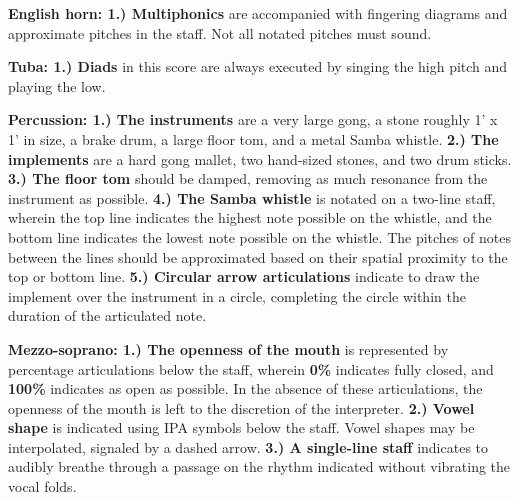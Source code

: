 \documentclass[11pt]{article}
\begin{document}
\begingroup
\textbf{English horn: 1.) Multiphonics} are accompanied with fingering diagrams and approximate pitches in the staff. Not all notated pitches must sound.
\endgroup

\begingroup
\textbf{Tuba: 1.) Diads} in this score are always executed by singing the high pitch and playing the low. 
\endgroup

\begingroup
\textbf{Percussion: 1.) The instruments} are a very large gong, a stone roughly 1' x 1' in size, a brake drum, a large floor tom, and a metal Samba whistle. \textbf{2.) The implements} are a hard gong mallet, two hand-sized stones, and two drum sticks. \textbf{3.) The floor tom} should be damped, removing as much resonance from the instrument as possible. \textbf{4.) The Samba whistle} is notated on a two-line staff, wherein the top line indicates the highest note possible on the whistle, and the bottom line indicates the lowest note possible on the whistle. The pitches of notes between the lines should be approximated based on their spatial proximity to the top or bottom line. \textbf{5.) Circular arrow articulations} indicate to draw the implement over the instrument in a circle, completing the circle within the duration of the articulated note.
\endgroup

\begingroup
\textbf{Mezzo-soprano: 1.) The openness of the mouth} is represented by percentage articulations below the staff, wherein \textbf{0\%} indicates fully closed, and \textbf{100\%} indicates as open as possible. In the absence of these articulations, the openness of the mouth is left to the discretion of the interpreter. \textbf{2.) Vowel shape} is indicated using IPA symbols below the staff. Vowel shapes may be interpolated, signaled by a dashed arrow. \textbf{3.) A single-line staff} indicates to audibly breathe through a passage on the rhythm indicated without vibrating the vocal folds.
\endgroup
\end{document}
